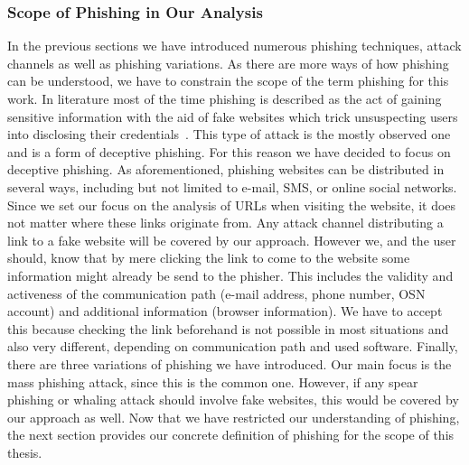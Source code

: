 \begin{description}[leftmargin=0cm]
\end{description}

\subsubsection{Scope of Phishing in Our Analysis}
\label{s:scope}
In the previous sections we have introduced numerous phishing techniques, attack channels as well as phishing variations.
 As there are more ways of how phishing can be understood, we have to constrain the scope of the term phishing for this work.
 In literature most of the time phishing is described as the act of gaining sensitive information with the aid of fake websites which trick unsuspecting users into disclosing their credentials~\cite{sheng2007antiphishingphil, antiphishingtrendreport2013, kasperskyreport2013}.
This type of attack is the mostly observed one and is a form of deceptive phishing.
 For this reason we have decided to focus on deceptive phishing.
 As aforementioned, phishing websites can be distributed in several ways, including but not limited to e-mail, SMS, or online social networks.
 Since we set our focus on the analysis of URLs when visiting the website, it does not matter where these links originate from.
 Any attack channel distributing a link to a fake website will be covered by our approach.
 However we, and the user should, know that by mere clicking the link to come to the website some information might already be send to the phisher.
 This includes the validity and activeness of the communication path (e-mail address, phone number, OSN account) and additional information (browser information). We have to accept this because checking the link beforehand is not possible in most situations and also very different, depending on communication path and used software.
  Finally, there are three variations of phishing we have introduced.
 Our main focus is the mass phishing attack, since this is the common one.
 However, if any spear phishing or whaling attack should involve fake websites, this would be covered by our approach as well.
Now that we have restricted our understanding of phishing, the next section provides our concrete definition of phishing for the scope of this thesis.

